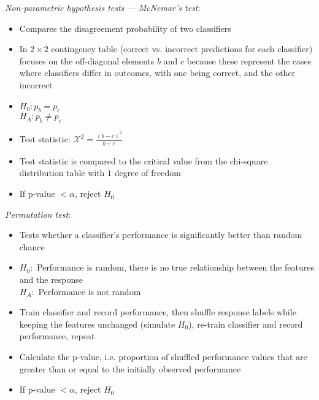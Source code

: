 \emph{Non-parametric hypothesis tests} --- 
\emph{McNemar’s test}:
\begin{itemize}
    \item Compares the disagreement probability of two classifiers 
    \item In $2 \times 2$ contingency table (correct vs. incorrect predictions for each classifier) focuses on the off-diagonal elements $b$ and $c$ because these represent the cases where classifiers differ in outcomes, with one being correct, and the other incorrect
    \item $H_0: p_b = p_c$\\
    $H_A: p_b \neq p_c$
    \item Test statistic: $\mathcal{X}^2 = \frac{(b-c)^2}{b+c}$
    \item Test statistic is compared to the critical value from the chi-square distribution table with $1$ degree of freedom
    \item If p-value $< \alpha$, reject $H_0$
\end{itemize}
\emph{Permutation test}:
\begin{itemize}
    \item Tests whether a classifier's performance is significantly better than random chance
    \item $H_0:$ Performance is random, there is no true relationship between the features and the response\\
    $H_A:$ Performance is not random
    \item Train classifier and record performance, then shuffle response labels while keeping the features unchanged (simulate $H_0$), re-train classifier and record performance, repeat
    \item Calculate the p-value, i.e. proportion of shuffled performance values that are greater than or equal to the initially observed performance
    \item If p-value $< \alpha$, reject $H_0$
\end{itemize}